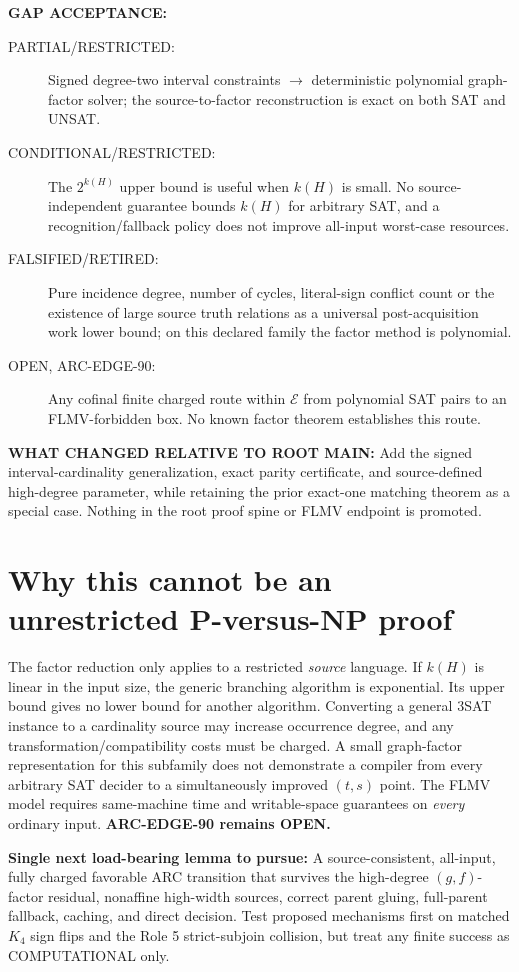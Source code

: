 \documentclass[11pt]{article}
\begin{document}
\textbf{GAP ACCEPTANCE:}
\begin{description}
\item[PARTIAL/RESTRICTED:] Signed degree-two interval constraints
\(\longrightarrow\) deterministic polynomial graph-factor solver;
the source-to-factor reconstruction is exact on both SAT and UNSAT.
\item[CONDITIONAL/RESTRICTED:] The \(2^{k(H)}\) upper bound is useful
when \(k(H)\) is small. No source-independent guarantee bounds
\(k(H)\) for arbitrary SAT, and a recognition/fallback policy
does not improve all-input worst-case resources.
\item[FALSIFIED/RETIRED:] Pure incidence degree, number of cycles,
literal-sign conflict count or the existence of large source
truth relations as a universal post-acquisition work lower bound;
on this declared family the factor method is polynomial.
\item[OPEN, ARC-EDGE-90:] Any cofinal finite charged route within
\(\mathcal E\) from polynomial SAT pairs to an FLMV-forbidden box.
No known factor theorem establishes this route.
\end{description}

\textbf{WHAT CHANGED RELATIVE TO ROOT MAIN:}
Add the signed interval-cardinality generalization, exact parity
certificate, and source-defined high-degree parameter, while retaining
the prior exact-one matching theorem as a special case. Nothing in the
root proof spine or FLMV endpoint is promoted.

\section{Why this cannot be an unrestricted P-versus-NP proof}
The factor reduction only applies to a restricted \emph{source}
language. If \(k(H)\) is linear in the input size, the generic
branching algorithm is exponential. Its upper bound gives no lower
bound for another algorithm. Converting a general 3SAT instance to
a cardinality source may increase occurrence degree, and any
transformation/compatibility costs must be charged.
A small graph-factor representation for this subfamily does not
demonstrate a compiler from every arbitrary SAT decider to a
simultaneously improved \((t,s)\) point. The FLMV model requires
same-machine time and writable-space guarantees on \emph{every}
ordinary input. \textbf{ARC-EDGE-90 remains OPEN.}

\textbf{Single next load-bearing lemma to pursue:}
A source-consistent, all-input, fully charged favorable ARC transition
that survives the high-degree \((g,f)\)-factor residual, nonaffine
high-width sources, correct parent gluing, full-parent fallback,
caching, and direct decision. Test proposed mechanisms first on
matched \(K_4\) sign flips and the Role 5 strict-subjoin collision,
but treat any finite success as COMPUTATIONAL only.
\end{document}
